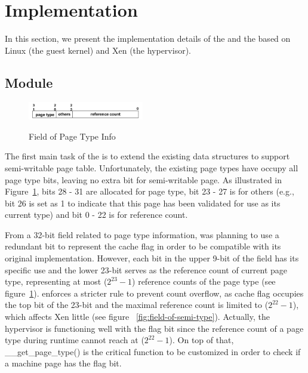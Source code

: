 \section{Implementation} \label{sec:impl}
In this section, we present the implementation details of the \module and the \cache based on Linux (the guest kernel) and Xen (the hypervisor).

\subsection{\name Module}
\begin{figure}[ht]
\centering
\includegraphics[width=0.45\textwidth]{image/implementation/field-of-page-type-info.png} \\
\caption{Field of Page Type Info}
\label{fig:field-of-page-type-info}
\end{figure}
The first main task of the \module is to extend the existing data structures to support semi-writable page table.
Unfortunately, the existing page types have occupy all page type bits, leaving no extra bit for semi-writable page.
As illustrated in Figure~\ref{fig:field-of-page-type-info}, bits 28 - 31 are allocated for page type, bit 23 - 27 is for others (e.g., bit 26 is set as 1 to indicate that this page has been validated for use as its current type) and bit 0 - 22 is for reference count.

From a 32-bit field related to page type information, \name was planning to use a redundant bit to represent the cache flag in order to be compatible with its original implementation. However, each bit in the upper 9-bit of the field has its specific use and the lower 23-bit serves as the reference count of current page type, representing at most ($2^{23}-1$) reference counts of the page type (see figure~\ref{fig:field-of-page-type-info}). \name enforces a stricter rule to prevent count overflow, as cache flag occupies the top bit of the 23-bit and the maximal reference count is limited to ($2^{22}-1$), which affects Xen little (see figure ~\ref{fig:field-of-semi-type}). Actually, the hypervisor is functioning well with the flag bit since the reference count of a page type during runtime cannot reach at ($2^{22}-1$). On top of that, \_\_get\_page\_type() is the critical function to be customized in order to check if a machine page has the flag bit.

